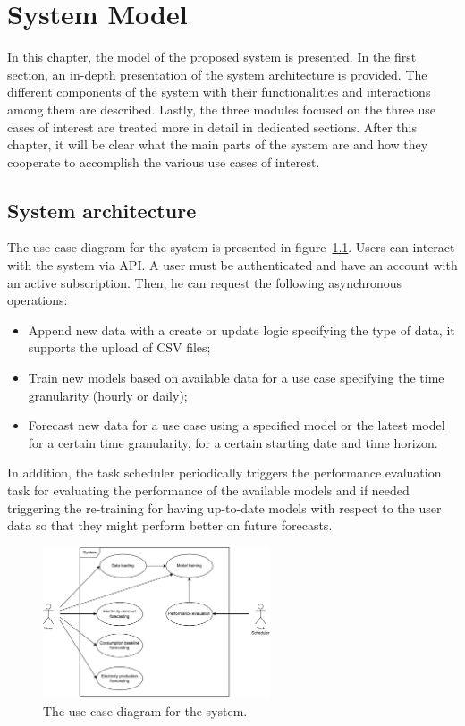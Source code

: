 \chapter{System Model}
\label{cha:system}
\vspace{0.4 cm}

In this chapter, the model of the proposed system is presented.
In the first section, an in-depth presentation of the system architecture is provided.
The different components of the system with their functionalities and interactions among them are described.
Lastly, the three modules focused on the three use cases of interest are treated more in detail in dedicated sections.
After this chapter, it will be clear what the main parts of the system are and how they cooperate to accomplish the various use cases of interest.


\section{System architecture}
\label{sec:architecture}
\vspace{0.2 cm}


The use case diagram for the system is presented in figure~\ref{fig:usecase}.
Users can interact with the system via API.
A user must be authenticated and have an account with an active subscription.
Then, he can request the following asynchronous operations:
\begin{itemize}
  \item Append new data with a create or update logic specifying the type of data, it supports the upload of CSV files;
  \item Train new models based on available data for a use case specifying the time granularity (hourly or daily);
  \item Forecast new data for a use case using a specified model or the latest model for a certain time granularity, for a certain starting date and time horizon.
\end{itemize}

In addition, the task scheduler periodically triggers the performance evaluation task for evaluating the performance of the available models and if needed triggering the re-training for having up-to-date models with respect to the user data so that they might perform better on future forecasts.

\begin{figure}[H]
\centering
\includegraphics[width=0.6\textwidth]{images/architecture_use_case}
\caption{The use case diagram for the system.}
\label{fig:usecase}
\end{figure}

